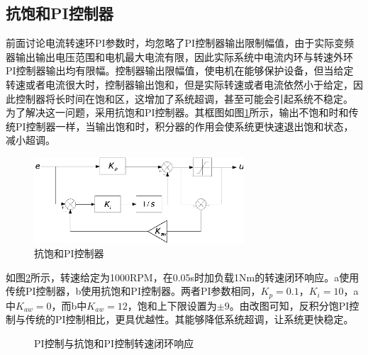 \subsection{抗饱和PI控制器}
前面讨论电流转速环PI参数时，均忽略了PI控制器输出限制幅值，由于实际变频器输出输出电压范围和电机最大电流有限，因此实际系统中电流内环与转速外环PI控制器输出均有限幅。控制器输出限幅值，使电机在能够保护设备，但当给定转速或者电流很大时，控制器输出饱和，但是实际转速或者电流依然小于给定，因此控制器将长时间在饱和区，这增加了系统超调，甚至可能会引起系统不稳定。
为了解决这一问题，采用抗饱和PI控制器。其框图如图\ref{fig:antiwindup_pi}所示，输出不饱和时和传统PI控制器一样，当输出饱和时，积分器的作用会使系统更快速退出饱和状态，减小超调。
\begin{figure}[H]
	\centering
	\includegraphics[width=0.7\textwidth]{figs/antiwindup_pi.eps}
	\caption{抗饱和PI控制器}
	\label{fig:antiwindup_pi}
\end{figure}
如图\ref{fig:pi_speed_loop}所示，转速给定为1000RPM，在0.05s时加负载1Nm的转速闭环响应。a使用传统PI控制器，b使用抗饱和PI控制器。两者PI参数相同，$K_{p}=0.1$，$K_{i}=10$，a中$K_{aw}=0$，而b中$K_{aw}=12$，饱和上下限设置为$\pm 9$。由改图可知，反积分饱PI控制与传统的PI控制相比，更具优越性。其能够降低系统超调，让系统更快稳定。
\begin{figure} [h]
	\centering%
	\hspace{2em}%
	\caption{PI控制与抗饱和PI控制转速闭环响应}
	\label{fig:pi_speed_loop}
\end{figure}
